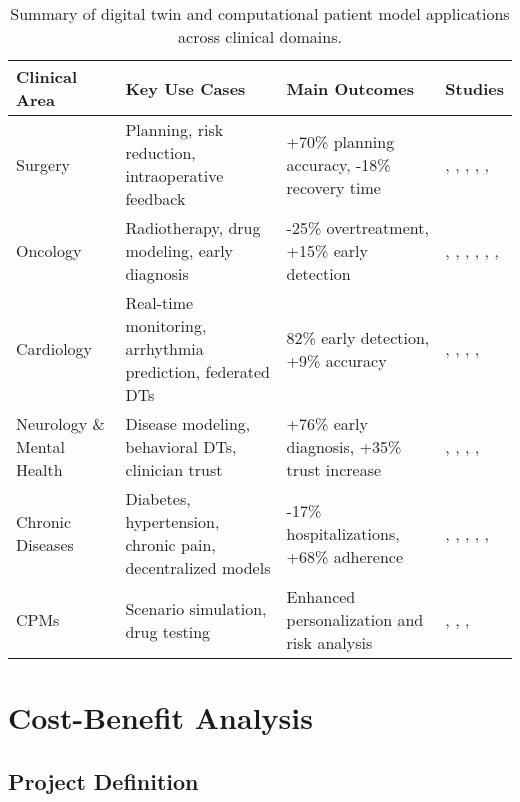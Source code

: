 \documentclass[10pt,a4paper]{article}
\begin{document}
\begin{table}[H]
\centering
\begin{tabular}{|p{2.6cm}|p{5cm}|p{5cm}|p{2cm}|}
\hline
\textbf{Clinical Area} & \textbf{Key Use Cases} & \textbf{Main Outcomes} & \textbf{Studies} \\
\hline
Surgery & Planning, risk reduction, intraoperative feedback & +70\% planning accuracy, -18\% recovery time & \cite{liu2019}, \cite{Liang2024}, \cite{Fekonja2024}, \cite{bjelland2022}, \cite{Alsalloum2024}, \cite{Mascret2024} \\
\hline
Oncology & Radiotherapy, drug modeling, early diagnosis & -25\% overtreatment, +15\% early detection & \cite{Cellina2023}, \cite{Puranik2022}, \cite{wu2022}, \cite{Balasubramanyam2024}, \cite{Panayides2020}, \cite{Venkatesh2024}, \cite{Boverhof2024} \\
\hline
Cardiology & Real-time monitoring, arrhythmia prediction, federated DTs & 82\% early detection, +9\% accuracy & \cite{liu2019}, \cite{Khater2024b}, \cite{Ali2023}, \cite{Lu2023}, \cite{Wang2025} \\
\hline
Neurology \& Mental Health & Disease modeling, behavioral DTs, clinician trust & +76\% early diagnosis, +35\% trust increase & \cite{Abilkaiyrkyzy2024}, \cite{Vidovszky2024}, \cite{Siva Sai2024}, \cite{Fekonja2024}, \cite{Alsalloum2024} \\
\hline
Chronic Diseases & Diabetes, hypertension, chronic pain, decentralized models & -17\% hospitalizations, +68\% adherence & \cite{Panayides2020}, \cite{Subramanian2022b}, \cite{Stephanie2024}, \cite{Venkatesh2024}, \cite{Ahmed2023}, \cite{Getachew2024} \\
\hline
CPMs & Scenario simulation, drug testing & Enhanced personalization and risk analysis & \cite{Khater2024b}, \cite{Balasubramanyam2024}, \cite{Fekonja2024}, \cite{Wu2025} \\
\hline
\end{tabular}
\caption{Summary of digital twin and computational patient model applications across clinical domains.}
\label{tabella2}
\end{table}

\section{Cost-Benefit Analysis}

\subsection{Project Definition}
\end{document}
